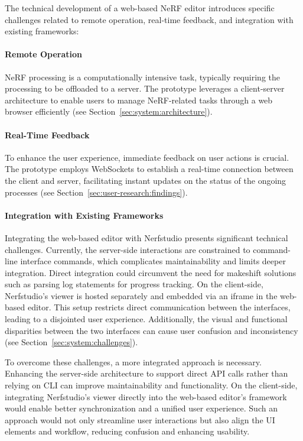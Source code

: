 The technical development of a web-based NeRF editor introduces specific challenges related to remote operation, real-time feedback, and integration with existing frameworks:

\paragraph{Remote Operation} NeRF processing is a computationally intensive task, typically requiring the processing to be offloaded to a server.
The prototype leverages a client-server architecture to enable users to manage NeRF-related tasks through a web browser efficiently (see Section~\ref{sec:system:architecture}).
    
\paragraph{Real-Time Feedback} To enhance the user experience, immediate feedback on user actions is crucial.
The prototype employs WebSockets to establish a real-time connection between the client and server, facilitating instant updates on the status of the ongoing processes (see Section~\ref{sec:user-research:findings}).
    
\paragraph{Integration with Existing Frameworks} Integrating the web-based editor with Nerfstudio presents significant technical challenges.
Currently, the server-side interactions are constrained to command-line interface commands, which complicates maintainability and limits deeper integration.
Direct integration could circumvent the need for makeshift solutions such as parsing log statements for progress tracking.
On the client-side, Nerfstudio's viewer is hosted separately and embedded via an iframe in the web-based editor.
This setup restricts direct communication between the interfaces, leading to a disjointed user experience.
Additionally, the visual and functional disparities between the two interfaces can cause user confusion and inconsistency (see Section~\ref{sec:system:challenges}).

To overcome these challenges, a more integrated approach is necessary.
Enhancing the server-side architecture to support direct API calls rather than relying on CLI can improve maintainability and functionality.
On the client-side, integrating Nerfstudio's viewer directly into the web-based editor's framework would enable better synchronization and a unified user experience.
Such an approach would not only streamline user interactions but also align the UI elements and workflow, reducing confusion and enhancing usability.


